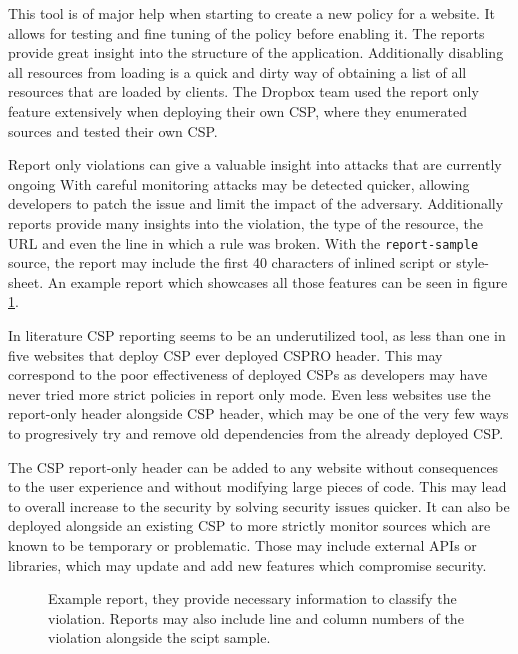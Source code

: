 This tool is of major help when starting to create a new policy for a website.
It allows for testing and fine tuning of the policy before enabling it. 
The reports provide great insight into the structure of the application.
Additionally disabling all resources from loading is a quick and dirty way of obtaining a list of all resources that are loaded by clients.
The Dropbox team used the report only feature extensively when deploying their own CSP, where they enumerated sources and tested their own CSP. \cite{dropboxcsp}


Report only violations can give a valuable insight into attacks that are currently ongoing 
With careful monitoring attacks may be detected quicker, allowing developers to patch the issue and limit the impact of the adversary.
Additionally reports provide many insights into the violation, the type of the resource, the URL and even the line in which a rule was broken.
With the \texttt{report-sample} source, the report may include the first 40 characters of inlined script or style-sheet. 
An example report which showcases all those features can be seen in figure \ref{exReport}.

In literature CSP reporting seems to be an underutilized tool, as less than one in five websites that deploy CSP ever deployed CSPRO header. \cite{osti_10173479}
This may correspond to the poor effectiveness of deployed CSPs as developers may have never tried more strict policies in report only mode.
Even less websites use the report-only header alongside CSP header, which may be one of the very few ways to progresively try and remove old dependencies from the already deployed CSP.

The CSP report-only header can be added to any website without consequences to the user experience and without modifying large pieces of code.
This may lead to overall increase to the security by solving security issues quicker.
It can also be deployed alongside an existing CSP to more strictly monitor sources which are known to be temporary or problematic.
Those may include external APIs or libraries, which may update and add new features which compromise security.

\begin{figure}[h]
	
	\caption{Example report, they provide necessary information to classify the violation. Reports may also include line and column numbers of the violation alongside the scipt sample.  }
	\label{exReport}
\end{figure}


